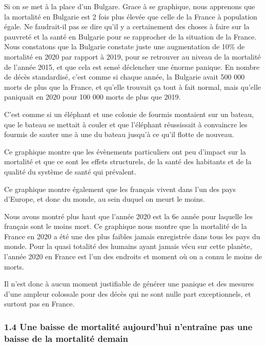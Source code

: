 \documentclass[
]{article}
\begin{document}
Si on se met à la place d'un Bulgare. Grace à se graphique, nous
apprenons que la mortalité en Bulgarie est 2 fois plus élevée que celle
de la France à population égale. Ne faudrait-il pas se dire qu'il y a
certainement des choses à faire sur la pauvreté et la santé en Bulgarie
pour se rapprocher de la situation de la France. Nous constatons que la
Bulgarie constate juste une augmentation de 10\% de mortalité en 2020
par rapport à 2019, pour se retrouver au niveau de la mortalité de
l'année 2015, et que cela est sensé déclencher une énorme panique. En
nombre de décès standardisé, c'est comme si chaque année, la Bulgarie
avait 500 000 morts de plus que la France, et qu'elle trouvait ça tout à
fait normal, mais qu'elle paniquait en 2020 pour 100 000 morts de plus
que 2019.

C'est comme si un éléphant et une colonie de fourmis montaient sur un
bateau, que le bateau se mettait à couler et que l'éléphant réussissait
à convaincre les fourmis de sauter une à une du bateau jusqu'à ce qu'il
flotte de nouveau.

Ce graphique montre que les évènements particuliers ont peu d'impact sur
la mortalité et que ce sont les effets structurels, de la santé des
habitants et de la qualité du système de santé qui prévalent.

Ce graphique montre également que les français vivent dans l'un des pays
d'Europe, et donc du monde, au sein duquel on meurt le moins.

Nous avons montré plus haut que l'année 2020 est la 6e année pour
laquelle les français sont le moins mort. Ce graphique nous montre que
la mortalité de la France en 2020 a été une des plus faibles jamais
enregistrée dans tous les pays du monde. Pour la quasi totalité des
humains ayant jamais vécu sur cette planète, l'année 2020 en France est
l'un des endroits et moment où on a connu le moins de morts.

Il n'est donc à aucun moment justifiable de générer une panique et des
mesures d'une ampleur colossale pour des décès qui ne sont nulle part
exceptionnels, et surtout pas en France.

\hypertarget{une-baisse-de-mortalituxe9-aujourdhui-nentrauxeene-pas-une-baisse-de-la-mortalituxe9-demain}{%
\subsubsection{1.4 Une baisse de mortalité aujourd'hui n'entraîne pas
une baisse de la mortalité
demain}\label{une-baisse-de-mortalituxe9-aujourdhui-nentrauxeene-pas-une-baisse-de-la-mortalituxe9-demain}}
\end{document}
